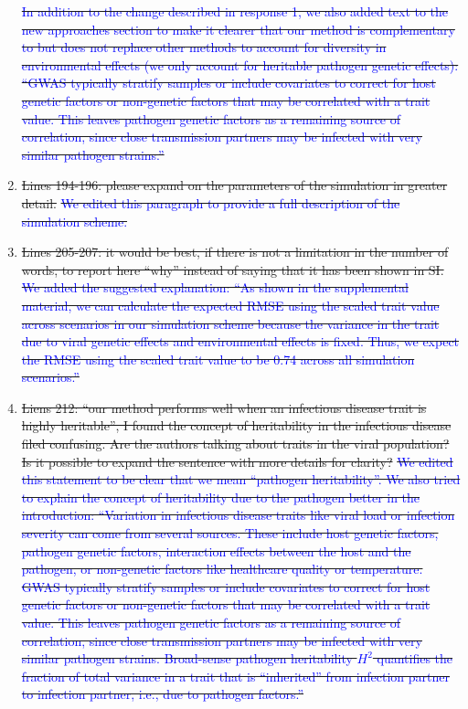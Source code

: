 \documentclass[12pt]{article} %
\providecommand{\DIFdel}[1]{{\protect\color{red}\sout{#1}}}                      %
\begin{document}
\begin{enumerate}
\DIFdel{\textcolor{blue}{In addition to the change described in response 1, we also added text to the new approaches section to make it clearer that our method is complementary to but does not replace other methods to account for diversity in environmental effects (we only account for heritable pathogen genetic effects): ``GWAS typically stratify samples or include covariates to correct for host genetic factors or non-genetic factors that may be correlated with a trait value. This leaves pathogen genetic factors as a remaining source of correlation, since close transmission partners may be infected with very similar pathogen strains.''}
    }%
\item%
\DIFdel{Lines 194-196:  please expand on the parameters of the simulation in greater detail. }%
\DIFdel{\textcolor{blue}{We edited this paragraph to provide a full description of the simulation scheme.}  
    }%
\item%
\DIFdel{Lines 205-207: it would be best, if there is not a limitation in the number of words, to report here “why” instead of saying that it has been shown in SI. }%
\DIFdel{\textcolor{blue}{We added the suggested explanation: ``As shown in the supplemental material, we can calculate the expected RMSE using the scaled trait value across scenarios in our simulation scheme because the variance in the trait due to viral genetic effects and environmental effects is fixed. Thus, we expect the RMSE using the scaled trait value to be 0.74 across all simulation scenarios.''}
    }%
\item%
\DIFdel{Liens 212: “our method performs well when an infectious disease trait is highly heritable”, I found the concept of heritability in the infectious disease filed confusing. Are the authors talking about traits in the viral population? Is it possible to expand the sentence with more details for clarity? }%
\DIFdel{\textcolor{blue}{We edited this statement to be clear that we mean ``pathogen heritability''. We also tried to explain the concept of heritability due to the pathogen better in the introduction: ``Variation in infectious disease traits like viral load or infection severity can come from several sources. These include host genetic factors, pathogen genetic factors, interaction effects between the host and the pathogen, or non-genetic factors like healthcare quality or temperature. GWAS typically stratify samples or include covariates to correct for host genetic factors or non-genetic factors that may be correlated with a trait value. This leaves pathogen genetic factors as a remaining source of correlation, since close transmission partners may be infected with very similar pathogen strains. Broad-sense pathogen heritability $H^2$ quantifies the fraction of total variance in a trait that is ``inherited'' from infection partner to infection partner, i.e., due to pathogen factors.''}
}
\end{enumerate}
\end{document}
